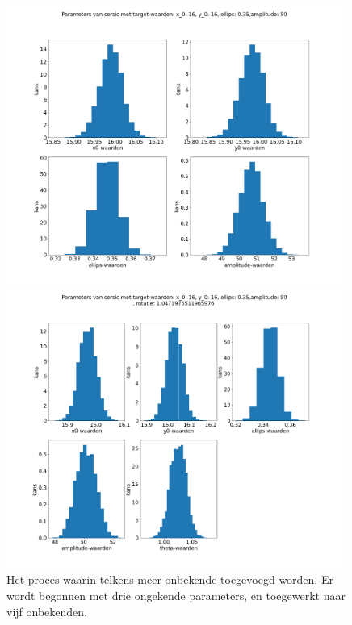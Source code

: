 \begin{figure}[H]
    \begin{minipage}{0.49\linewidth}
        \includegraphics[width=0.98\textwidth]{Figures/sersic_parameters_metropolis_8500000_1500000_50_amplitude (1).png}
    \end{minipage}
    \begin{minipage}{0.49\linewidth}
    \includegraphics[width=0.98\textwidth]{Figures/sersic_parameters_metropolis_8500000_1500000_50_theta (2).png}
    \end{minipage}
    \caption{Het proces waarin telkens meer onbekende toegevoegd worden. Er wordt begonnen met drie ongekende parameters, en toegewerkt naar vijf onbekenden.}
    \label{fig:4 onbekenden}
\end{figure}

\newpage
\twocolumn



